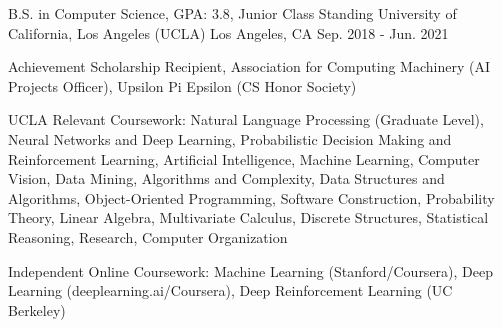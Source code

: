 

\begin{cventries}

\cventry
{B.S. in Computer Science, GPA: 3.8, Junior Class Standing} %
{University of California, Los Angeles (UCLA)} %
{Los Angeles, CA} %
{Sep. 2018 - Jun. 2021} %
{
  \begin{cvitems} %
    \item {Achievement Scholarship Recipient, Association for Computing Machinery
    (AI Projects Officer), Upsilon Pi Epsilon (CS Honor Society)}
    \item {UCLA Relevant Coursework: Natural Language Processing
    (Graduate Level), Neural Networks and Deep Learning, Probabilistic Decision Making and Reinforcement 
    Learning, Artificial Intelligence, Machine Learning, Computer Vision, Data Mining,
    Algorithms and Complexity, Data Structures and Algorithms, Object-Oriented 
    Programming, Software Construction, Probability Theory, Linear Algebra, 
    Multivariate Calculus, Discrete Structures, Statistical Reasoning, 
    Research, Computer Organization}
    \item {Independent Online Coursework: Machine Learning (Stanford/Coursera), Deep Learning (deeplearning.ai/Coursera), Deep Reinforcement Learning (UC Berkeley)}
  \end{cvitems}
}

\end{cventries}
